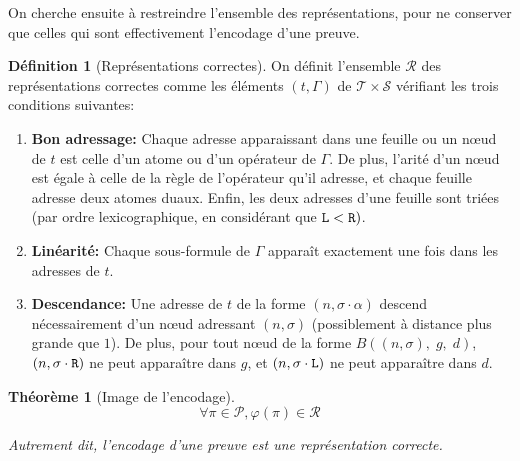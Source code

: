 \documentclass[11pt,a4paper]{article}
\theoremstyle{plain}
\newtheorem{theorem}{Théorème}
\theoremstyle{definition}
\newtheorem{definition}{Définition}
\theoremstyle{remark}
\newcommand*{\someproof}{\pi}
\newcommand*{\sequent}{\Gamma}
\newcommand*{\Left}{\textnormal{\texttt{L}}}
\newcommand*{\Right}{\textnormal{\texttt{R}}}
\newcommand*{\proofs}{\ensuremath{\mathcal{P}}}
\newcommand*{\sequents}{\ensuremath{\mathcal{S}}}
\newcommand*{\trees}{\ensuremath{\mathcal{T}}}
\newcommand*{\representationslarge}{\ensuremath{\trees \times \sequents}}
\newcommand*{\representations}{\ensuremath{\mathcal{R}}}
\newcommand*{\encode}{\ensuremath{\varphi}}
\begin{document}
On cherche ensuite à restreindre l'ensemble des représentations, pour ne conserver que celles qui sont effectivement l'encodage d'une preuve.

\begin{definition}[Représentations correctes]
    \label{def_rep}
    On définit l'ensemble \representations{} des représentations correctes comme les éléments $(t, \sequent)$ de $\representationslarge$ vérifiant les trois conditions suivantes:
    
    \begin{enumerate}
    \item\label{cadd} \textbf{Bon adressage:} Chaque adresse apparaissant dans une feuille ou un n\oe ud de $t$ est celle d'un atome ou d'un opérateur de $\sequent$. De plus, l'arité d'un n\oe ud est égale à celle de la règle de l'opérateur qu'il adresse, et chaque feuille adresse deux atomes duaux. Enfin, les deux adresses d'une feuille sont triées (par ordre lexicographique, en considérant que $\Left < \Right)$.
    \item\label{clin} \textbf{Linéarité:} Chaque sous-formule de $\sequent$ apparaît exactement une fois dans les adresses de $t$.
    \item\label{cdes} \textbf{Descendance:} Une adresse de $t$ de la forme $(n, \sigma \cdot \alpha)$ descend nécessairement d'un n\oe ud adressant $(n, \sigma)$ (possiblement à distance plus grande que $1$). De plus, pour tout n\oe ud de la forme $B((n, \sigma), \; g, \; d)$, $(n, \sigma \cdot \Right)$ ne peut apparaître dans $g$, et $(n, \sigma \cdot \Left)$ ne peut apparaître dans $d$.
    \end{enumerate}
\end{definition}

\begin{theorem}[Image de l'encodage]
    \begin{equation*}
    \forall \someproof \in \proofs, \encode \left( \someproof \right) \in \representations
    \end{equation*}

    Autrement dit, l'encodage d'une preuve est une représentation correcte.
\end{theorem}
\end{document}
